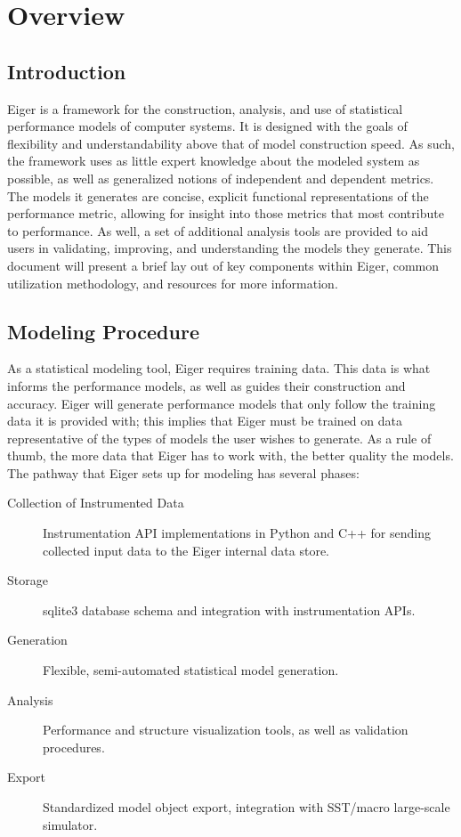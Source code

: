 \section{Overview}
\label{sec:over}
\subsection{Introduction}
Eiger is a framework for the construction, analysis, and use of
statistical performance models of computer systems.  It is designed with
the goals of flexibility and understandability above that of model
construction speed.  As such, the framework uses as little expert
knowledge about the modeled system as possible, as well as generalized
notions of independent and dependent metrics. The models it generates
are concise, explicit functional representations of the performance
metric, allowing for insight into those metrics that most contribute to
performance. As well, a set of additional analysis tools are provided to
aid users in validating, improving, and understanding the models they
generate. This document will present a brief lay out of key components
within Eiger, common utilization methodology, and resources for more
information.

\subsection{Modeling Procedure}
As a statistical modeling tool, Eiger requires training data. This data
is what informs the performance models, as well as guides their
construction and accuracy.  Eiger will generate performance models that
only follow the training data it is provided with; this implies that
Eiger must be trained on data representative of the types of models the
user wishes to generate. As a rule of thumb, the more data that Eiger
has to work with, the better quality the models. The pathway that Eiger
sets up for modeling has several phases:

	\begin{description}
		\item[Collection of Instrumented Data]
		Instrumentation API implementations in Python and C++ for sending collected input data to the Eiger internal data store.
		\item[Storage]
		sqlite3 database schema and integration with instrumentation
		APIs.
		\item[Generation]
		Flexible, semi-automated statistical model generation.
		\item[Analysis]
		Performance and structure visualization tools, as well as
		validation procedures.
		\item[Export]
		Standardized model object export, integration with SST/macro
		large-scale simulator.
	\end{description}

